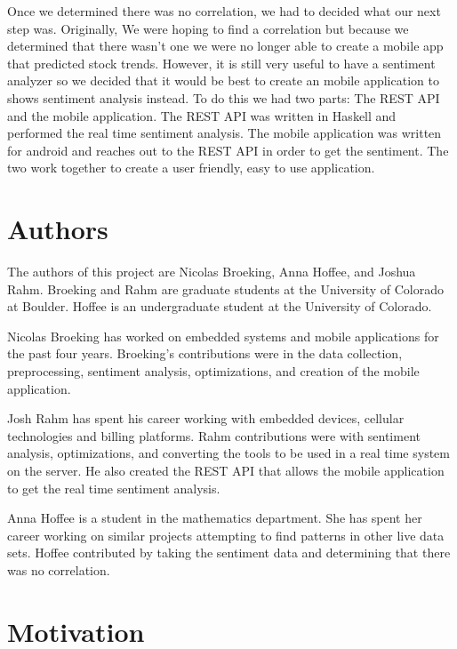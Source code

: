 \documentclass{acm_proc_article-sp}
\begin{document}
Once we determined there was no correlation, we had to decided what our
next step was. Originally, We were hoping to find a correlation but because we determined
that there wasn't one we were no longer able to create a mobile app
that predicted stock trends. However, it is still very useful to have a
sentiment analyzer so we decided that it would be best to create an mobile application to
shows sentiment analysis instead. To do this we had two parts: The REST API
and the mobile application. The REST API was written in Haskell and performed the real
time sentiment analysis.  The mobile application was written for android and reaches out
to the REST API in order to get the sentiment. The two work together to create a user
friendly, easy to use application.


\section{Authors}

The authors of this project are Nicolas Broeking, Anna
Hoffee, and Joshua Rahm. Broeking and Rahm are graduate students at the
University of Colorado at Boulder. Hoffee is an undergraduate student at the
University of Colorado.

Nicolas Broeking has worked on embedded systems and mobile applications for
the past four years. Broeking's contributions were in the data collection,
preprocessing, sentiment analysis, optimizations, and creation of the mobile
application. 

Josh Rahm has spent his career working with embedded devices, cellular
technologies and billing platforms. Rahm contributions were with sentiment
analysis, optimizations, and converting the tools to be used in a real time
system on the server. He also created  the REST API that allows the mobile application to get
the real time sentiment analysis.

Anna Hoffee is a student in the mathematics department. She has spent her
career working on similar projects attempting to find patterns in other live
data sets. Hoffee contributed by taking the sentiment data and determining that
there was no correlation.

\section{Motivation}
\end{document}
